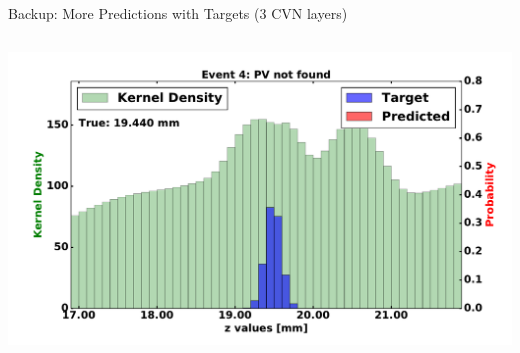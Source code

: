 \begin{frame}{Backup: More Predictions with Targets (3 CVN layers)}
\begin{columns}[c]
\begin{center}
           \includegraphics[width=1\textwidth, height=0.45\textwidth, trim=18 0 18 0]{images/120000_3layer_23.pdf}
       \end{center}
  \end{columns}
\end{frame}

